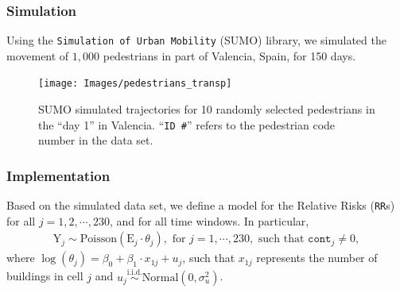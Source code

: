 \documentclass[12pt, aspectratio = 169]{beamer} %
\begin{document}
	\begin{frame}[t]
		\frametitle{Simulation}
		\justifying	
		Using the \texttt{Simulation of Urban Mobility} (SUMO) library, we simulated the movement of $1{,}000$ pedestrians in part of Valencia, Spain, for 150 days.
		
		\begin{figure}
			\centering \vspace{-16pt}
			\texttt{[image: Images/pedestrians\_transp]} \vspace{-22pt}
			\caption{\justifying SUMO simulated trajectories for 10 randomly selected pedestrians in the ``day 1'' in Valencia. ``\texttt{ID \#}''\hspace{-2pt} refers to the pedestrian code number in the data set.}
			\label{fig:pedestrians}
		\end{figure}\vspace{-3pt}
	\end{frame}

%		
	
	\begin{frame}[t]
		\frametitle{Implementation}
		\justifying	
		
		Based on the simulated data set, we define a model for the Relative Risks (\texttt{RR}s) for all $ j = 1, 2, \cdots, 230$, and for all time windows. In particular,
		\begin{align*}
			\text{Y}_j \sim \text{Poisson}(\text{E}_j \cdot \theta_j), \text{ for } j = 1, \cdots, 230, \text{ such that $\texttt{cont}_j \neq 0$},
		\end{align*}
		where $\log(\theta_j) = \beta_0 + \beta_1 \cdot x_{1j} + u_j$, such that $x_{1j}$ represents the number of buildings in cell $j$ and $u_j \overset{\text{i.i.d.}}{\sim} \text{Normal}(0, \sigma^2_{u})$.
	\end{frame}
	
\end{document}
